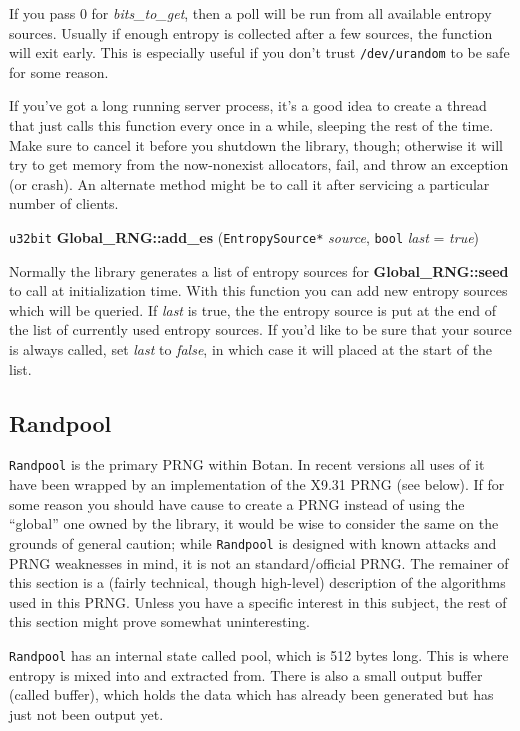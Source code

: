 \documentclass{article}
\newcommand{\filename}[1]{\texttt{#1}}
\newcommand{\function}[1]{\textbf{#1}}
\newcommand{\type}[1]{\texttt{#1}}
\renewcommand{\arg}[1]{\textsl{#1}}
\begin{document}
If you pass 0 for \arg{bits\_to\_get}, then a poll will be run from all
available entropy sources. Usually if enough entropy is collected after a few
sources, the function will exit early. This is especially useful if you don't
trust \filename{/dev/urandom} to be safe for some reason.

If you've got a long running server process, it's a good idea to create a
thread that just calls this function every once in a while, sleeping the rest
of the time. Make sure to cancel it before you shutdown the library, though;
otherwise it will try to get memory from the now-nonexist allocators, fail, and
throw an exception (or crash). An alternate method might be to call it after
servicing a particular number of clients.

\vskip 5pt
\noindent
\type{u32bit} \function{Global\_RNG::add\_es}
(\type{EntropySource*} \arg{source}, \type{bool} \arg{last} = \arg{true})

Normally the library generates a list of entropy sources for
\function{Global\_RNG::seed} to call at initialization time. With this function
you can add new entropy sources which will be queried. If \arg{last} is true,
the the entropy source is put at the end of the list of currently used entropy
sources. If you'd like to be sure that your source is always called, set
\arg{last} to \arg{false}, in which case it will placed at the start of the
list.

\subsection{Randpool}

\type{Randpool} is the primary PRNG within Botan. In recent versions all uses
of it have been wrapped by an implementation of the X9.31 PRNG (see below). If
for some reason you should have cause to create a PRNG instead of using the
``global'' one owned by the library, it would be wise to consider the same on
the grounds of general caution; while \type{Randpool} is designed with known
attacks and PRNG weaknesses in mind, it is not an standard/official PRNG. The
remainer of this section is a (fairly technical, though high-level) description
of the algorithms used in this PRNG. Unless you have a specific interest in
this subject, the rest of this section might prove somewhat uninteresting.

\type{Randpool} has an internal state called pool, which is 512 bytes
long. This is where entropy is mixed into and extracted from. There is also a
small output buffer (called buffer), which holds the data which has already
been generated but has just not been output yet.
\end{document}
